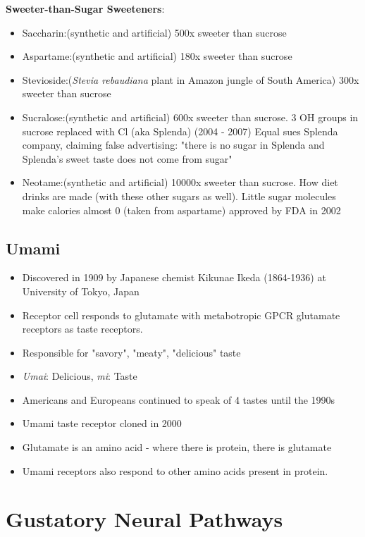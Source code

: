\documentclass{article}
\begin{document}
\noindent \textbf{Sweeter-than-Sugar Sweeteners}: 
\begin{itemize}
    \item Saccharin:(synthetic and artificial) 500x sweeter than sucrose
    \item Aspartame:(synthetic and artificial) 180x sweeter than sucrose
    \item Stevioside:(\textit{Stevia rebaudiana} plant in Amazon jungle of South America) 300x sweeter than sucrose 
    \item Sucralose:(synthetic and artificial) 600x sweeter than sucrose. 3 OH groups in sucrose replaced with Cl (aka Splenda)
        \subitem (2004 - 2007) Equal sues Splenda company, claiming false advertising: "there is no sugar in Splenda and Splenda's sweet taste does not come from sugar"
    \item Neotame:(synthetic and artificial) 10000x sweeter than sucrose. 
        \subitem How diet drinks are made (with these other sugars as well). Little sugar molecules make calories almost 0 (taken from aspartame) approved by FDA in 2002
\end{itemize}

\subsection{Umami}

\begin{itemize}
    \item Discovered in 1909 by Japanese chemist Kikunae Ikeda (1864-1936) at University of Tokyo, Japan
    \item Receptor cell responds to glutamate with metabotropic GPCR glutamate receptors as taste receptors. 
    \item Responsible for "savory", "meaty", "delicious" taste
    \item \textit{Umai}: Delicious, \textit{mi}: Taste
    \item Americans and Europeans continued to speak of 4 tastes until the 1990s
    \item Umami taste receptor cloned in 2000
    \item Glutamate is an amino acid - where there is protein, there is glutamate
    \item Umami receptors also respond to other amino acids present in protein. 
\end{itemize}

\newpage
\section{Gustatory Neural Pathways}
\end{document}
